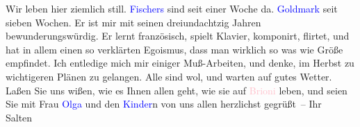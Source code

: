 \pstart
           Wir leben hier ziemlich still. \textcolor{blue}{Fischers}{}\ledrightnote{\textcolor{blue}{Samuel Fischer}{\newline}\textcolor{blue}{Hedwig Fischer}} sind seit einer Woche da. \textcolor{blue}{Goldmark}{}\ledrightnote{\textcolor{blue}{Karl Goldmark}} seit sieben Wochen. Er ist mir mit seinen dreiundachtzig Jahren
               bewunderungswürdig. Er lernt französisch, spielt Klavier, komponirt, flirtet, und hat
               in allem einen so verklärten Egoismus, dass man wirklich so was wie Größe empfindet.
               Ich entledige mich mir einiger Muß-Arbeiten, und denke, im Herbst zu wichtigeren
               Plänen zu gelangen. Alle sind wol, und warten auf gutes Wetter. Laßen Sie uns wißen,
               wie es Ihnen allen geht, wie sie auf \textcolor{pink}{Brioni}{}\ledrightnote{\textcolor{pink}{Brijuni}}
               leben, und seien Sie mit Frau \textcolor{blue}{Olga}{}\ledrightnote{\textcolor{blue}{Olga Schnitzler}} und den \textcolor{blue}{Kinder}{}\ledrightnote{{$\rightarrow$}\textcolor{blue}{Heinrich Schnitzler}{\newline}{$\rightarrow$}\textcolor{blue}{Lili Cappellini}}n von uns
               allen herzlichst gegrüßt –\pend
           \pstart Ihr \spacefill\mbox{Salten}\pend{}\endnumbering{}  
      